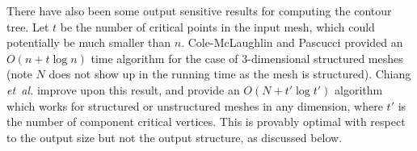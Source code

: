 \documentclass[11pt]{article}
\theoremstyle{definition}
\newcommand{\etal}{\textit{et~al.}\xspace}
\begin{document}
There have also been some output sensitive results for computing the contour tree.  Let $t$ be the number 
of critical points in the input mesh, which could potentially be much smaller than $n$.  
Cole-McLaughlin and Pascucci \cite{pc-ectls-02} provided an $O(n+t\log n)$ time algorithm for the case of 
$3$-dimensional structured meshes (note $N$ does not show up in the running time as the mesh is structured).
Chiang \etal \cite{cllr-sooscctmp-05} improve upon this result, and provide an $O(N+t'\log t')$ algorithm 
which works for structured or unstructured meshes in any dimension, where $t'$ is the number of component 
critical vertices.  This is provably optimal with respect to the output size but not the output structure, 
as discussed below.

\end{document}
